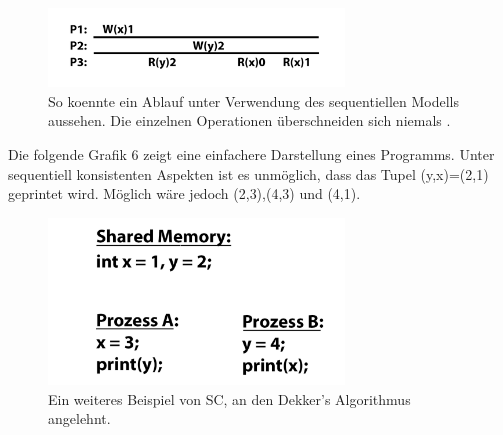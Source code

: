 \documentclass[final,bibliography=totocnumbered]{include/sikseminar}
\begin{document}
\begin{figure}[htbp] %
  \centering
  \includegraphics[width=0.7\textwidth]{figures/SeqModell1}
  \caption{So koennte ein Ablauf unter Verwendung des sequentiellen Modells aussehen. Die einzelnen Operationen überschneiden sich niemals \cite{mcm5}.}
  \label{Fig:SeqModell1}
\end{figure}

Die folgende Grafik 6 zeigt eine einfachere Darstellung eines Programms. Unter sequentiell konsistenten Aspekten ist es unmöglich, 
dass das Tupel (y,x)=(2,1) geprintet wird. Möglich wäre jedoch (2,3),(4,3) und (4,1).
\begin{figure}[htbp] %
  \centering
  \includegraphics[width=0.7\textwidth]{figures/sc2}
  \caption{Ein weiteres Beispiel von SC, an den Dekker's Algorithmus angelehnt.}
  \label{Fig:sc2}
\end{figure}
\end{document}
